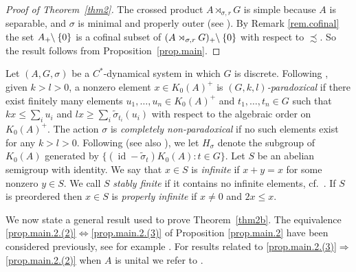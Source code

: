 \documentclass[a4paper, 12pt]{amsart}
\numberwithin{equation}{section}
\theoremstyle{remark}
\theoremstyle{definition}
\begin{document}
\begin{proof}[Proof of Theorem~\ref{thm2}] The  crossed product $A\rtimes_{\sigma,r} G$  is
simple because $A$ is separable, and $\sigma$ is minimal and properly outer (see
\cite{MR568973}). By Remark \ref{rem.cofinal} the set $A_+{\negthickspace}\setminus\{0\}$ is a
cofinal subset of $(A\rtimes_{\sigma,r} G)_+{\negthickspace}\setminus\{0\}$ with respect to
$\precsim$. So the result follows from Proposition~\ref{prop.main}.
\end{proof}

Let $(A,G,\sigma)$ be a $C^*$-dynamical system in which $G$ is discrete. Following
\cite{Rai}, given $k>l>0$, a nonzero element $x\in K_0(A)^+$ is \emph{$(G,k,l)$-paradoxical}
if there exist finitely many elements $u_1,\dots,u_n\in K_0(A)^+$ and
$t_1,\dots,t_n\in G$ such that $kx\leq \sum_iu_i$  and $lx\geq
\sum_i\tilde\sigma_{t_i}(u_i)$ with respect to the algebraic order on $K_0(A)^+$. The
action $\sigma$ is \emph{completely non-paradoxical} if no such elements exist for any
$k>l>0$. Following \cite{MR3210039} (see also \cite{MR3507995}), we let $H_\sigma$ denote the
subgroup of $K_0(A)$ generated by $\{({\operatorname{id}} - \tilde\sigma_t)K_0(A) : t \in  G\}$.
Let $S$
be an abelian semigroup with identity. We say that $x\in S$ is \emph{infinite} if
$x+y=x$ for some nonzero $y\in S$. We call $S$ \emph{stably finite} if it contains no
infinite elements, cf.~\cite{MR1998041}. If $S$ is preordered then $x\in S$ is
\emph{properly infinite} if $x\neq 0$ and $2x\leq x$.

We now state a general result used to prove Theorem~\ref{thm2b}. The equivalence \eqref{prop.main.2.(2)}$\Leftrightarrow$\eqref{prop.main.2.(3)} of Proposition \ref{prop.main.2} have been considered previously, see for example \cite[Proposition~3.1]{MR3507995}. For results related to \eqref{prop.main.2.(3)}$\Rightarrow$\eqref{prop.main.2.(2)} when $A$ is unital we refer to \cite[Theorem 4.2]{RaiSch}.
\end{document}

